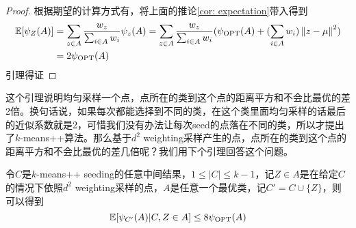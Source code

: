 \begin{proof}
    根据期望的计算方式有，将上面的推论\ref{cor: expectation}带入得到
    \begin{align}
        \mathbb{E}[\psi_Z(A)] &= \sum_{z \in A} \frac{w_z}{\sum_{i \in A} w_i} \psi_z(A) = \sum_{z \in A} \frac{w_z}{\sum_{i \in A} w_i} (\psi_{\text{OPT}}(A)+(\sum_{i \in A}w_i) \left\lVert z-\mu\right\rVert^2) \\
        &= 2 \psi_{\text{OPT}}(A)
    \end{align}
    引理得证
\end{proof}
这个引理说明均匀采样一个点，点所在的类到这个点的距离平方和不会比最优的差2倍。换句话说，如果每次都能选择到不同的类，在这个类里面均匀采样的话最后的近似系数就是2，可惜我们没有办法让每次seed的点落在不同的类，所以才提出了$k$-means++算法。那么基于$d^2$ weighting采样产生的点，点所在的类到这个点的距离平方和不会比最优的差几倍呢？我们用下个引理回答这个问题。
\begin{lemma}
    \label{lem: 8OPT_A}
    令$C$是$k$-means++ seeding的任意中间结果，$1 \leq |C| \leq k-1$，记$Z \in A$是在给定$C$的情况下依照$d^2$ weighting采样的点，$A$是任意一个最优类，记$C' = C \cup \{Z\}$，则可以得到
    \begin{equation}
        \mathbb{E}[\psi_{C'}(A)|C,Z \in A] \leq 8 \psi_{\text{OPT}}(A)
    \end{equation}
\end{lemma}
